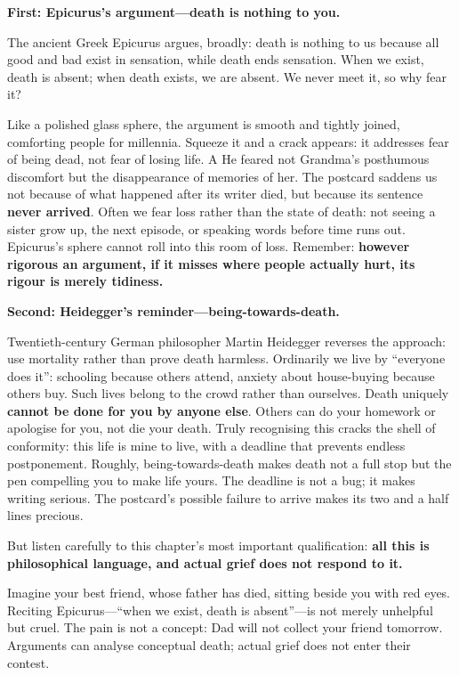 \textbf{First: Epicurus's argument---death is nothing to you.}

The ancient Greek Epicurus argues, broadly: death is nothing to us because all good and bad exist in sensation, while death ends sensation. When we exist, death is absent; when death exists, we are absent. We never meet it, so why fear it?

Like a polished glass sphere, the argument is smooth and tightly joined, comforting people for millennia. Squeeze it and a crack appears: it addresses fear of being dead, not fear of losing life. A He feared not Grandma's posthumous discomfort but the disappearance of memories of her. The postcard saddens us not because of what happened after its writer died, but because its sentence \textbf{never arrived}. Often we fear loss rather than the state of death: not seeing a sister grow up, the next episode, or speaking words before time runs out. Epicurus's sphere cannot roll into this room of loss. Remember: \textbf{however rigorous an argument, if it misses where people actually hurt, its rigour is merely tidiness.}

\textbf{Second: Heidegger's reminder---being-towards-death.}

Twentieth-century German philosopher Martin Heidegger reverses the approach: use mortality rather than prove death harmless. Ordinarily we live by ``everyone does it'': schooling because others attend, anxiety about house-buying because others buy. Such lives belong to the crowd rather than ourselves. Death uniquely \textbf{cannot be done for you by anyone else}. Others can do your homework or apologise for you, not die your death. Truly recognising this cracks the shell of conformity: this life is mine to live, with a deadline that prevents endless postponement. Roughly, being-towards-death makes death not a full stop but the pen compelling you to make life yours. The deadline is not a bug; it makes writing serious. The postcard's possible failure to arrive makes its two and a half lines precious.

But listen carefully to this chapter's most important qualification: \textbf{all this is philosophical language, and actual grief does not respond to it.}

Imagine your best friend, whose father has died, sitting beside you with red eyes. Reciting Epicurus---``when we exist, death is absent''---is not merely unhelpful but cruel. The pain is not a concept: Dad will not collect your friend tomorrow. Arguments can analyse conceptual death; actual grief does not enter their contest.

